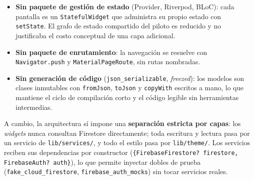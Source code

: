 \documentclass[12pt,a4paper]{article}
\begin{document}
\begin{itemize}
    \item \textbf{Sin paquete de gestión de estado} (Provider, Riverpod, BLoC): cada pantalla es un \texttt{StatefulWidget} que administra su propio estado con \texttt{setState}. El grafo de estado compartido del piloto es reducido y no justificaba el costo conceptual de una capa adicional.
    \item \textbf{Sin paquete de enrutamiento}: la navegación se resuelve con \texttt{Navigator.push} y \texttt{MaterialPageRoute}, sin rutas nombradas.
    \item \textbf{Sin generación de código} (\texttt{json\_serializable}, \emph{freezed}): los modelos son clases inmutables con \texttt{fromJson}, \texttt{toJson} y \texttt{copyWith} escritos a mano, lo que mantiene el ciclo de compilación corto y el código legible sin herramientas intermedias.
\end{itemize}

A cambio, la arquitectura sí impone una \textbf{separación estricta por capas}: los \emph{widgets} nunca consultan Firestore directamente; toda escritura y lectura pasa por un servicio de \texttt{lib/services/}, y todo el estilo pasa por \texttt{lib/theme/}. Los servicios reciben sus dependencias por constructor (\texttt{\{FirebaseFirestore? firestore, FirebaseAuth? auth\}}), lo que permite inyectar dobles de prueba (\texttt{fake\_cloud\_firestore}, \texttt{firebase\_auth\_mocks}) sin tocar servicios reales.
\end{document}
